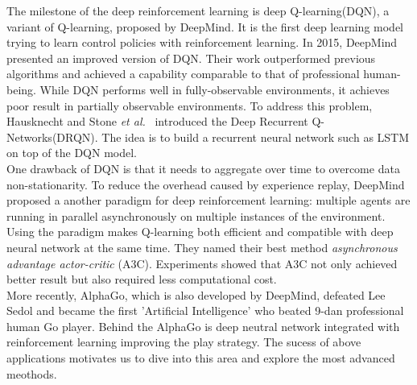 
The milestone of the deep reinforcement learning is deep Q-learning(DQN)\cite{mnih2013playing}, a variant of Q-learning, proposed by DeepMind. It is the first deep learning model trying to learn control policies with reinforcement learning. In 2015, DeepMind presented an improved version of DQN\cite{mnih2015human}. Their work outperformed previous algorithms and achieved a capability comparable to that of professional human-being.
While DQN performs well in fully-observable environments, it achieves poor result in partially observable environments. To address this problem, Hausknecht and Stone \textit{et al.}~\cite{hausknecht2015deep} introduced the Deep Recurrent Q-Networks(DRQN). The idea is to build a recurrent neural network such as LSTM on top of the DQN model.\\
%
One drawback of DQN is that it needs to aggregate over time to overcome data non-stationarity. To reduce the overhead caused by experience replay, DeepMind \cite{mnih2016asynchronous} proposed a another paradigm for deep reinforcement learning: multiple agents are running in parallel asynchronously on multiple instances of the environment. Using the paradigm makes Q-learning both efficient and compatible with deep neural network at the same time. They named their best method \textit{asynchronous advantage actor-critic} (A3C). Experiments showed that A3C not only achieved better result but also required less computational cost.\\
More recently, AlphaGo\cite{brockman2016openai}, which is also developed by DeepMind, defeated Lee Sedol and became the first 'Artificial Intelligence' who beated 9-dan professional human Go player. Behind the AlphaGo is deep neutral network integrated with reinforcement learning improving the play strategy. The sucess of above applications motivates us to dive into this area and
explore the most advanced meothods. \\


